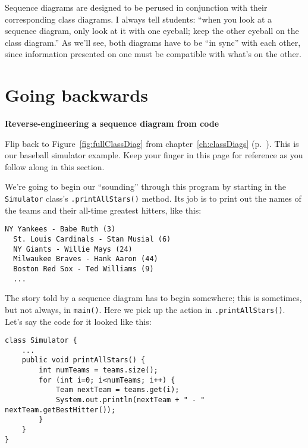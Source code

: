 Sequence diagrams are designed to be perused in conjunction with their
corresponding class diagrams. I always tell students: ``when you look at a
sequence diagram, only look at it with one eyeball; keep the other eyeball on
the class diagram.'' As we'll see, both diagrams have to be ``in sync'' with
each other, since information presented on one must be compatible with what's
on the other.

\section{Going backwards}

\vspace{-.2in}
{\large \textbf{Reverse-engineering a sequence diagram from code}}

Flip back to Figure~\ref{fig:fullClassDiag} from chapter~\ref{ch:classDiags}
(p.~\pageref{fig:fullClassDiag}). This is our baseball simulator example. Keep
your finger in this page for reference as you follow along in this section.

We're going to begin our ``sounding'' through this program by starting in the
\texttt{Simulator} class's \texttt{.printAllStars()} method. Its job is to
print out the names of the teams and their all-time greatest hitters, like
this:

\begin{Verbatim}[fontsize=\normalsize,samepage=true,frame=single]
  NY Yankees - Babe Ruth (3)
  St. Louis Cardinals - Stan Musial (6)
  NY Giants - Willie Mays (24)
  Milwaukee Braves - Hank Aaron (44)
  Boston Red Sox - Ted Williams (9)
  ...
\end{Verbatim}

The story told by a sequence diagram has to begin somewhere; this is
sometimes, but not always, in \texttt{main()}. Here we pick up the action in
\texttt{.printAllStars()}. Let's say the code for it looked like this:

\begin{Verbatim}[fontsize=\small,samepage=true,frame=single]
class Simulator {
    ...
    public void printAllStars() {
        int numTeams = teams.size();
        for (int i=0; i<numTeams; i++) {
            Team nextTeam = teams.get(i);
            System.out.println(nextTeam + " - " nextTeam.getBestHitter());
        }
    }
}
\end{Verbatim}


